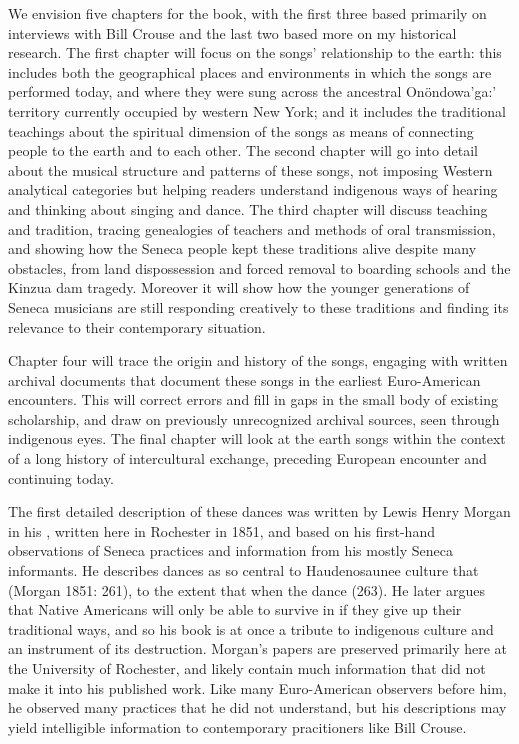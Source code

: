 \documentclass[12pt]{article}
\begin{document}
We envision five chapters for the book, with the first three based primarily
on interviews with Bill Crouse and the last two based more on my historical
research.
The first chapter will focus on the songs' relationship to the earth: this
includes both the geographical places and environments in which the songs are
performed today, and where they were sung across the ancestral Onöndowa'ga:'
territory currently occupied by western New York; and it includes the
traditional teachings about the spiritual dimension of the songs as means of
connecting people to the earth and to each other.
The second chapter will go into detail about the musical structure and
patterns of these songs, not imposing Western analytical categories but
helping readers understand indigenous ways of hearing and thinking about
singing and dance.
The third chapter will discuss teaching and tradition, tracing genealogies of
teachers and methods of oral transmission, and showing how the Seneca people
kept these traditions alive despite many obstacles, from land dispossession
and forced removal to boarding schools and the Kinzua dam tragedy.
Moreover it will show how the younger generations of Seneca musicians are
still responding creatively to these traditions and finding its relevance to
their contemporary situation.

Chapter four will trace the origin and history of the songs, engaging with
written archival documents that document these songs in the earliest
Euro-American encounters.
This will correct errors and fill in gaps in the small body of existing
scholarship, and draw on previously unrecognized archival sources, seen
through indigenous eyes.
The final chapter will look at the earth songs within the context of a long
history of intercultural exchange, preceding European encounter and continuing
today.

The first detailed description of these dances was written by Lewis Henry
Morgan in his , written
here in Rochester in 1851, and based on his first-hand observations of Seneca
practices and information from his mostly Seneca informants.
He describes dances as so central to Haudenosaunee culture that  (Morgan
1851: 261), to the extent that when the dance  (263).
He later argues that Native Americans will only be able to survive in
 if they give up their traditional ways, and so his book
is at once a tribute to indigenous culture and an instrument of its
destruction.
Morgan's papers are preserved primarily here at the University of Rochester,
and likely contain much information that did not make it into his published
work.
Like many Euro-American observers before him, he observed many practices that
he did not understand, but his descriptions may yield intelligible information
to contemporary pracitioners like Bill Crouse.
\end{document}
